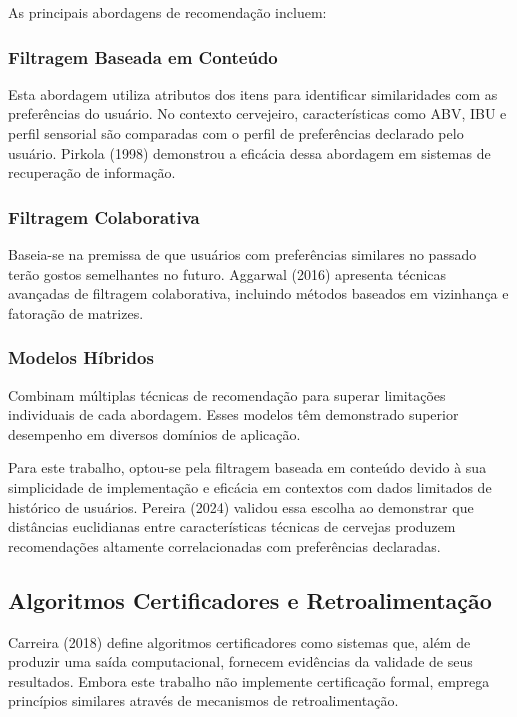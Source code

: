 \documentclass[12pt,a4paper]{article}
\begin{document}
As principais abordagens de recomendação incluem:

\subsubsection{Filtragem Baseada em Conteúdo}

Esta abordagem utiliza atributos dos itens para identificar similaridades com as preferências do usuário. No contexto cervejeiro, características como ABV, IBU e perfil sensorial são comparadas com o perfil de preferências declarado pelo usuário. Pirkola (1998) demonstrou a eficácia dessa abordagem em sistemas de recuperação de informação.

\subsubsection{Filtragem Colaborativa}

Baseia-se na premissa de que usuários com preferências similares no passado terão gostos semelhantes no futuro. Aggarwal (2016) apresenta técnicas avançadas de filtragem colaborativa, incluindo métodos baseados em vizinhança e fatoração de matrizes.

\subsubsection{Modelos Híbridos}

Combinam múltiplas técnicas de recomendação para superar limitações individuais de cada abordagem. Esses modelos têm demonstrado superior desempenho em diversos domínios de aplicação.

Para este trabalho, optou-se pela filtragem baseada em conteúdo devido à sua simplicidade de implementação e eficácia em contextos com dados limitados de histórico de usuários. Pereira (2024) validou essa escolha ao demonstrar que distâncias euclidianas entre características técnicas de cervejas produzem recomendações altamente correlacionadas com preferências declaradas.

\subsection{Algoritmos Certificadores e Retroalimentação}

Carreira (2018) define algoritmos certificadores como sistemas que, além de produzir uma saída computacional, fornecem evidências da validade de seus resultados. Embora este trabalho não implemente certificação formal, emprega princípios similares através de mecanismos de retroalimentação.
\end{document}
